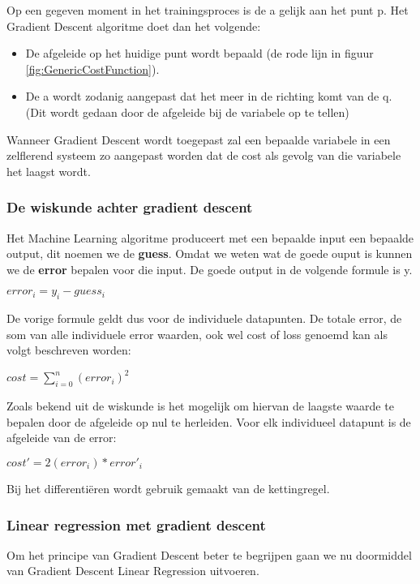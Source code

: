 Op een gegeven moment in het trainingsproces is de a gelijk aan het punt p. Het Gradient Descent algoritme doet dan het volgende:
\begin{itemize}
\item De afgeleide op het huidige punt wordt bepaald (de rode lijn in figuur \ref{fig:GenericCostFunction}).
\item De a wordt zodanig aangepast dat het meer in de richting komt van de q. (Dit wordt gedaan door de afgeleide bij de variabele op te tellen)
\end{itemize}

Wanneer Gradient Descent wordt toegepast zal een bepaalde variabele in een zelflerend systeem zo aangepast worden dat de cost als gevolg van die variabele het laagst wordt. 

\subsubsection{De wiskunde achter gradient descent}
Het Machine Learning algoritme produceert met een bepaalde input een bepaalde output, dit noemen we de \textbf{guess}. Omdat we weten wat de goede ouput is kunnen we de \textbf{error} bepalen voor die input. De goede output in de volgende formule is y.

\begin{center}
$ error_{i} = y_{i} - guess_{i}$
\end{center} 

De vorige formule geldt dus voor de individuele datapunten. De totale error, de som van alle individuele error waarden, ook wel cost of loss genoemd kan als volgt beschreven worden:

\begin{center}
$ cost = \sum_{i=0}^n(error_i)^2$
\end{center}

Zoals bekend uit de wiskunde is het mogelijk om hiervan de laagste waarde te bepalen door de afgeleide op nul te herleiden. Voor elk individueel datapunt is de afgeleide van de error:

\begin{center}
$ cost' = 2(error_i) * error'_i$
\end{center}

Bij het differentiëren wordt gebruik gemaakt van de kettingregel.

\subsubsection{Linear regression met gradient descent}
Om het principe van Gradient Descent beter te begrijpen gaan we nu doormiddel van Gradient Descent Linear Regression uitvoeren.

